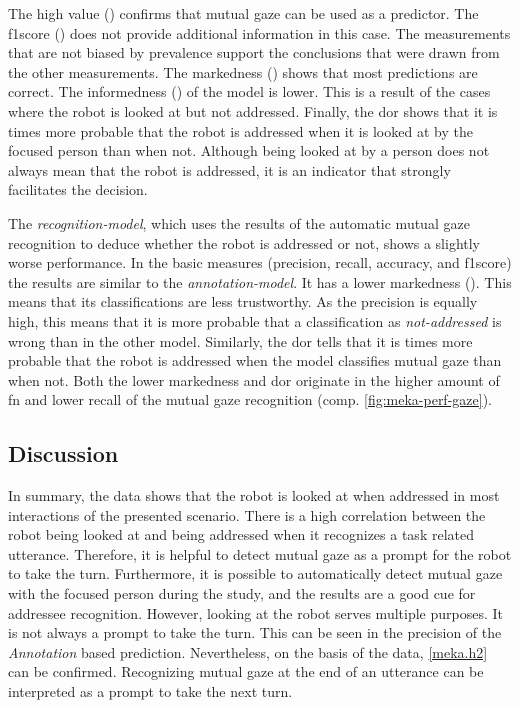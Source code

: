 The high value () confirms that mutual gaze can be used as a predictor.
The \gls{f1score} () does not provide additional information in this case.
The measurements that are not biased by \gls{prevalence} support the conclusions that were drawn from the other measurements.
The \gls{markedness} () shows that most predictions are correct. 
The \gls{informedness} () of the model is lower.
This is a result of the cases where the \gls{robot} is looked at but not addressed.
Finally, the \gls{dor} shows that it is  times more probable that the \gls{robot} is addressed when it is looked at by the focused person than when not.
Although being looked at by a person does not always mean that the \gls{robot} is addressed, it is an indicator that strongly facilitates the decision. 

The \emph{recognition-model}, which uses the results of the automatic mutual gaze recognition to deduce whether the \gls{robot} is addressed or not, shows a slightly worse performance.
In the basic measures (\gls{precision}, \gls{recall}, \gls{accuracy}, and \gls{f1score}) the results are similar to the \emph{annotation-model}.
It has a lower \gls{markedness} ().
This means that its classifications are less trustworthy.
As the \gls{precision} is equally high, this means that it is more probable that a classification as \emph{not-addressed} is wrong than in the other model.
Similarly, the \gls{dor} tells that it is  times more probable that the \gls{robot} is addressed when the model classifies mutual gaze than when not.
Both the lower \gls{markedness} and \gls{dor} originate in the higher amount of \acrlong{fn} and lower \gls{recall} of the mutual gaze recognition (comp. \cref{fig:meka-perf-gaze}).

\subsection{Discussion}

In summary, the data shows that the \gls{robot} is looked at when addressed in most interactions of the presented scenario.
There is a high correlation between the \gls{robot} being looked at and being addressed when it recognizes a task related utterance.
Therefore, it is helpful to detect mutual gaze as a prompt for the \gls{robot} to take the \gls{turn}.
Furthermore, it is possible to automatically detect mutual gaze with the focused person during the study, and the results are a good cue for \gls{addressee} recognition.
However, looking at the \gls{robot} serves multiple purposes.
It is not always a prompt to take the \gls{turn}.
This can be seen in the \gls{precision} of the \emph{Annotation} based prediction.
Nevertheless, on the basis of the data, \cref{meka.h2} can be confirmed.
Recognizing mutual gaze at the end of an utterance can be interpreted as a prompt to take the next \gls{turn}.

